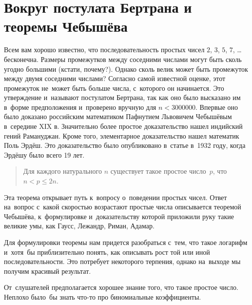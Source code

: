 
\section*{Вокруг постулата Бертрана и теоремы Чебышёва}



Всем вам хорошо известно, что последовательность простых чисел
$2$, $3$, $5$, $7$, {\ldots} бесконечна.
Размеры промежутков между соседними числами могут быть сколь угодно большими
(кстати, почему?).
Однако сколь велик может быть промежуток между двумя соседними числами?
Согласно самой известной оценке, этот промежуток не~может быть больше числа,
с~которого он начинается.
Это утверждение и~называют постулатом Бертрана, так как оно было высказано им
в~форме предположения и~проверено вручную для $n < 3000000$.
Впервые оно было доказано российским математиком Пафнутием Львовичем Чебышёвым
в~середине XIX в.
Значительно более простое доказательство нашел индийский гений Рамануджан.
Кроме того, элементарное доказательство нашел математик Поль Эрдёш.
Это доказательство было опубликовано в~статье в~1932 году, когда Эрдёшу было
всего 19 лет.

\begin{quote}

Для каждого натурального $n$ существует такое простое число~$p$, что
$n < p \leq 2 n$.

\end{quote}

Эта теорема открывает путь к~вопросу о~поведении простых чисел.
Ответ на~вопрос с~какой скоростью возрастают простые числа
описывается теоремой Чебышёва, к~формулировке и~доказательству которой
приложили руку такие великие умы, как Гаусс, Лежандр, Риман, Адамар.

Для формулировки теоремы нам придется разобраться с~тем, что такое логарифм
и~хотя~бы приблизительно понять, как описывать рост той или иной
последовательности.
Это потребует некоторого терпения, однако на~выходе мы получим красивый
результат.

От~слушателей предполагается хорошее знание того, что такое простое число.
Неплохо было~бы знать что-то про биномиальные коэффициенты.

